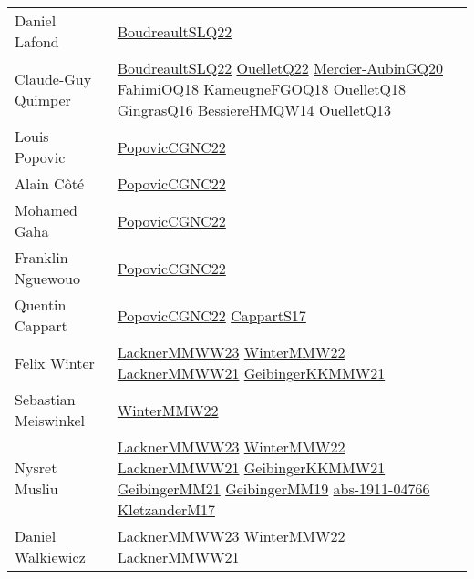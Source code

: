 {\begin{longtable}{p{4cm}p{15cm}}
Daniel Lafond & \href{papers/BoudreaultSLQ22.pdf}{BoudreaultSLQ22}\cite{BoudreaultSLQ22} \\
Claude{-}Guy Quimper & \href{papers/BoudreaultSLQ22.pdf}{BoudreaultSLQ22}\cite{BoudreaultSLQ22} \href{papers/OuelletQ22.pdf}{OuelletQ22}\cite{OuelletQ22} \href{papers/Mercier-AubinGQ20.pdf}{Mercier-AubinGQ20}\cite{Mercier-AubinGQ20} \href{articles/FahimiOQ18.pdf}{FahimiOQ18}\cite{FahimiOQ18} \href{papers/KameugneFGOQ18.pdf}{KameugneFGOQ18}\cite{KameugneFGOQ18} \href{papers/OuelletQ18.pdf}{OuelletQ18}\cite{OuelletQ18} \href{papers/GingrasQ16.pdf}{GingrasQ16}\cite{GingrasQ16} \href{papers/BessiereHMQW14.pdf}{BessiereHMQW14}\cite{BessiereHMQW14} \href{papers/OuelletQ13.pdf}{OuelletQ13}\cite{OuelletQ13} \\
Louis Popovic & \href{papers/PopovicCGNC22.pdf}{PopovicCGNC22}\cite{PopovicCGNC22} \\
Alain C{\^{o}}t{\'{e}} & \href{papers/PopovicCGNC22.pdf}{PopovicCGNC22}\cite{PopovicCGNC22} \\
Mohamed Gaha & \href{papers/PopovicCGNC22.pdf}{PopovicCGNC22}\cite{PopovicCGNC22} \\
Franklin Nguewouo & \href{papers/PopovicCGNC22.pdf}{PopovicCGNC22}\cite{PopovicCGNC22} \\
Quentin Cappart & \href{papers/PopovicCGNC22.pdf}{PopovicCGNC22}\cite{PopovicCGNC22} \href{papers/CappartS17.pdf}{CappartS17}\cite{CappartS17} \\
Felix Winter & \href{articles/LacknerMMWW23.pdf}{LacknerMMWW23}\cite{LacknerMMWW23} \href{papers/WinterMMW22.pdf}{WinterMMW22}\cite{WinterMMW22} \href{papers/LacknerMMWW21.pdf}{LacknerMMWW21}\cite{LacknerMMWW21} \href{papers/GeibingerKKMMW21.pdf}{GeibingerKKMMW21}\cite{GeibingerKKMMW21} \\
Sebastian Meiswinkel & \href{papers/WinterMMW22.pdf}{WinterMMW22}\cite{WinterMMW22} \\
Nysret Musliu & \href{articles/LacknerMMWW23.pdf}{LacknerMMWW23}\cite{LacknerMMWW23} \href{papers/WinterMMW22.pdf}{WinterMMW22}\cite{WinterMMW22} \href{papers/LacknerMMWW21.pdf}{LacknerMMWW21}\cite{LacknerMMWW21} \href{papers/GeibingerKKMMW21.pdf}{GeibingerKKMMW21}\cite{GeibingerKKMMW21} \href{papers/GeibingerMM21.pdf}{GeibingerMM21}\cite{GeibingerMM21} \href{papers/GeibingerMM19.pdf}{GeibingerMM19}\cite{GeibingerMM19} \href{articles/abs-1911-04766.pdf}{abs-1911-04766}\cite{abs-1911-04766} \href{papers/KletzanderM17.pdf}{KletzanderM17}\cite{KletzanderM17} \\
Daniel Walkiewicz & \href{articles/LacknerMMWW23.pdf}{LacknerMMWW23}\cite{LacknerMMWW23} \href{papers/WinterMMW22.pdf}{WinterMMW22}\cite{WinterMMW22} \href{papers/LacknerMMWW21.pdf}{LacknerMMWW21}\cite{LacknerMMWW21} \\

\end{longtable}}
